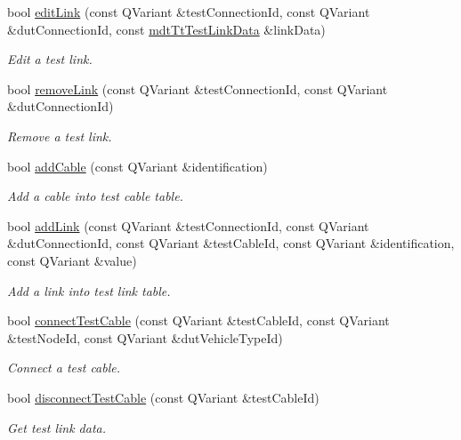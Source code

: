 \begin{DoxyCompactItemize}
bool \hyperlink{classmdt_tt_logical_test_cable_ad786c86aa5b62a7f9537f0b4e4cab05c}{edit\-Link} (const Q\-Variant \&test\-Connection\-Id, const Q\-Variant \&dut\-Connection\-Id, const \hyperlink{classmdt_tt_test_link_data}{mdt\-Tt\-Test\-Link\-Data} \&link\-Data)
\begin{DoxyCompactList}\small\item\em Edit a test link. \end{DoxyCompactList}\item 
bool \hyperlink{classmdt_tt_logical_test_cable_af7cacf5b2cd8d919403f9b28a7c691d3}{remove\-Link} (const Q\-Variant \&test\-Connection\-Id, const Q\-Variant \&dut\-Connection\-Id)
\begin{DoxyCompactList}\small\item\em Remove a test link. \end{DoxyCompactList}\item 
bool \hyperlink{classmdt_tt_logical_test_cable_a17a8fd670453954e44b5718a0afcb2ba}{add\-Cable} (const Q\-Variant \&identification)
\begin{DoxyCompactList}\small\item\em Add a cable into test cable table. \end{DoxyCompactList}\item 
bool \hyperlink{classmdt_tt_logical_test_cable_a5abe6257d4ca126550b9ca9fb31a1ebc}{add\-Link} (const Q\-Variant \&test\-Connection\-Id, const Q\-Variant \&dut\-Connection\-Id, const Q\-Variant \&test\-Cable\-Id, const Q\-Variant \&identification, const Q\-Variant \&value)
\begin{DoxyCompactList}\small\item\em Add a link into test link table. \end{DoxyCompactList}\item 
bool \hyperlink{classmdt_tt_logical_test_cable_a87091b9c88f65fde6029b53c14afd92c}{connect\-Test\-Cable} (const Q\-Variant \&test\-Cable\-Id, const Q\-Variant \&test\-Node\-Id, const Q\-Variant \&dut\-Vehicle\-Type\-Id)
\begin{DoxyCompactList}\small\item\em Connect a test cable. \end{DoxyCompactList}\item 
bool \hyperlink{classmdt_tt_logical_test_cable_a6f26ebeb60eea2f0b0773d7b65ea90dc}{disconnect\-Test\-Cable} (const Q\-Variant \&test\-Cable\-Id)
\begin{DoxyCompactList}\small\item\em Get test link data. \end{DoxyCompactList}\end{DoxyCompactItemize}
